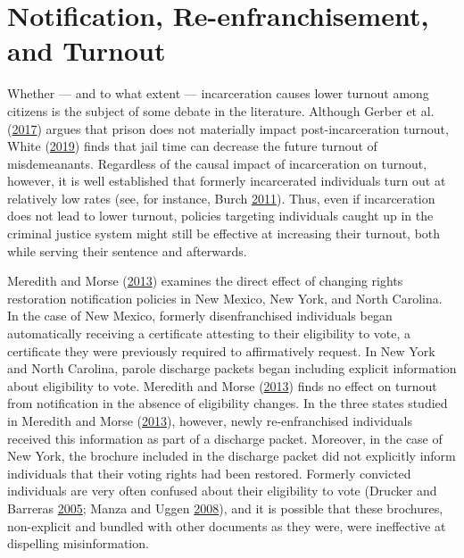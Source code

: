 \documentclass[
  12pt,
]{article}
\begin{document}
\hypertarget{notification-re-enfranchisement-and-turnout}{%
\section*{Notification, Re-enfranchisement, and Turnout}\label{notification-re-enfranchisement-and-turnout}}

Whether --- and to what extent --- incarceration causes lower turnout among citizens is the subject of some debate in the literature. Although Gerber et al. (\protect\hyperlink{ref-Gerber2017}{2017}) argues that prison does not materially impact post-incarceration turnout, White (\protect\hyperlink{ref-White2019}{2019}) finds that jail time can decrease the future turnout of misdemeanants. Regardless of the causal impact of incarceration on turnout, however, it is well established that formerly incarcerated individuals turn out at relatively low rates (see, for instance, Burch \protect\hyperlink{ref-Burch2011}{2011}). Thus, even if incarceration does not lead to lower turnout, policies targeting individuals caught up in the criminal justice system might still be effective at increasing their turnout, both while serving their sentence and afterwards.

Meredith and Morse (\protect\hyperlink{ref-Meredith2013}{2013}) examines the direct effect of changing rights restoration notification policies in New Mexico, New York, and North Carolina. In the case of New Mexico, formerly disenfranchised individuals began automatically receiving a certificate attesting to their eligibility to vote, a certificate they were previously required to affirmatively request. In New York and North Carolina, parole discharge packets began including explicit information about eligibility to vote. Meredith and Morse (\protect\hyperlink{ref-Meredith2013}{2013}) finds no effect on turnout from notification in the absence of eligibility changes. In the three states studied in Meredith and Morse (\protect\hyperlink{ref-Meredith2013}{2013}), however, newly re-enfranchised individuals received this information as part of a discharge packet. Moreover, in the case of New York, the brochure included in the discharge packet did not explicitly inform individuals that their voting rights had been restored. Formerly convicted individuals are very often confused about their eligibility to vote (Drucker and Barreras \protect\hyperlink{ref-Drucker2005}{2005}; Manza and Uggen \protect\hyperlink{ref-locked_out}{2008}), and it is possible that these brochures, non-explicit and bundled with other documents as they were, were ineffective at dispelling misinformation.
\end{document}
